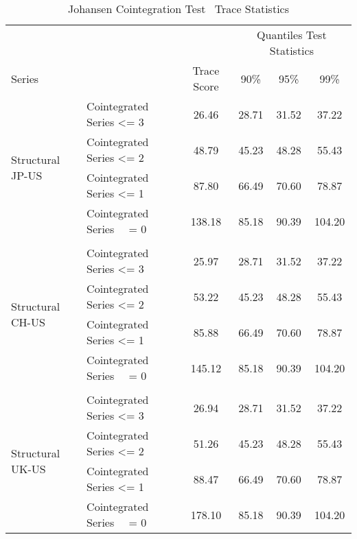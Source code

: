 \begin{table}[!h] %
  \centering
    \caption{Johansen Cointegration Test \textendash \ Trace Statistics}
  \begin{tabular}{llcccc} %
    \toprule
                                             &                                                 &               & \multicolumn{3}{c}{Quantiles Test Statistics}\\
    \cmidrule(r){1-6}
    Series                                   &                                                 & Trace Score   &  90\%     & 95\%     & 99\%\\
    \midrule
    \multirow{4}{*}{Structural JP-US}        & \multicolumn{1}{l}{Cointegrated Series <= 3}    & 26.46         & 28.71     & 31.52    & 37.22  \\
                                             & \multicolumn{1}{l}{Cointegrated Series <= 2}    & 48.79         & 45.23     & 48.28    & 55.43  \\ 
                                             & \multicolumn{1}{l}{Cointegrated Series <= 1}    & 87.80         & 66.49     & 70.60    & 78.87  \\
                                             & \multicolumn{1}{l}{Cointegrated Series \ \ = 0} & 138.18        & 85.18     & 90.39    & 104.20 \\
    \\
    \multirow{4}{*}{Structural CH-US}        & \multicolumn{1}{l}{Cointegrated Series <= 3}    & 25.97         & 28.71     & 31.52    & 37.22  \\
                                             & \multicolumn{1}{l}{Cointegrated Series <= 2}    & 53.22         & 45.23     & 48.28    & 55.43  \\ 
                                             & \multicolumn{1}{l}{Cointegrated Series <= 1}    & 85.88         & 66.49     & 70.60    & 78.87  \\
                                             & \multicolumn{1}{l}{Cointegrated Series \ \ = 0} & 145.12        & 85.18     & 90.39    & 104.20 \\
    \\
    \multirow{4}{*}{Structural UK-US}        & \multicolumn{1}{l}{Cointegrated Series <= 3}    & 26.94         & 28.71     & 31.52    & 37.22  \\
                                             & \multicolumn{1}{l}{Cointegrated Series <= 2}    & 51.26         & 45.23     & 48.28    & 55.43  \\ 
                                             & \multicolumn{1}{l}{Cointegrated Series <= 1}    & 88.47         & 66.49     & 70.60    & 78.87  \\
                                             & \multicolumn{1}{l}{Cointegrated Series \ \ = 0} & 178.10        & 85.18     & 90.39    & 104.20 \\
    \bottomrule
  \end{tabular}
\label{tab:Cointegration}
\end{table}


